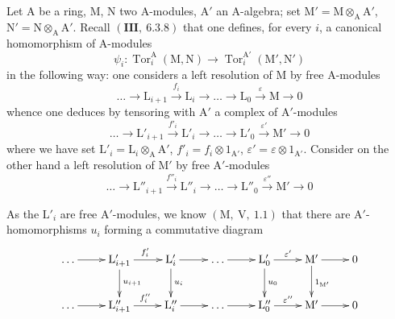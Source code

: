\begin{env}[11.2.1]
\label{IV.11.2.1}
Let $\mathrm{A}$ be a ring, $\mathrm{M}$, $\mathrm{N}$ two A-modules, $\mathrm{A}'$ an A-algebra; set $\mathrm{M}'=\mathrm{M}\otimes_\mathrm{A}\mathrm{A}'$, $\mathrm{N}'=\mathrm{N}\otimes_\mathrm{A}\mathrm{A}'$. Recall $(\textbf{III},~6.3.8)$ that one defines, for every $i$, a canonical homomorphism of A-modules
\begin{equation}
  \psi_i:\operatorname{Tor}_i^\mathrm{A}(\mathrm{M},\mathrm{N})\to\operatorname{Tor}_i^{\mathrm{A}'}(\mathrm{M}',\mathrm{N}')
  \tag{11.2.1.1}
\end{equation}
in the following way: one considers a left resolution of $\mathrm{M}$ by free A-modules
\begin{equation}
  \ldots\longrightarrow\mathrm{L}_{i+1}\xrightarrow{f_i}\mathrm{L}_i\longrightarrow\ldots\longrightarrow\mathrm{L}_0\xrightarrow{\varepsilon}\mathrm{M}\longrightarrow 0
  \tag{11.2.1.2}
\end{equation}
whence one deduces by tensoring with $\mathrm{A}'$ a complex of $\mathrm{A}'$-modules
\begin{equation}
  \ldots\longrightarrow\mathrm{L}'_{i+1}\xrightarrow{f'_i}\mathrm{L}'_i\longrightarrow\ldots\longrightarrow\mathrm{L}'_0\xrightarrow{\varepsilon'}\mathrm{M}'\longrightarrow 0
  \tag{11.2.1.3}
\end{equation}
where we have set $\mathrm{L}'_i=\mathrm{L}_i\otimes_\mathrm{A}\mathrm{A}'$, $f'_i=f_i\otimes 1_{\mathrm{A}'}$, $\varepsilon'=\varepsilon\otimes 1_{\mathrm{A}'}$. Consider on the other hand a left resolution of $\mathrm{M}'$ by free $\mathrm{A}'$-modules
\begin{equation}
  \ldots\longrightarrow\mathrm{L}''_{i+1}\xrightarrow{f''_i}\mathrm{L}''_i\longrightarrow\ldots\longrightarrow\mathrm{L}''_0\xrightarrow{\varepsilon''}\mathrm{M}'\longrightarrow 0
  \tag{11.2.1.4}
\end{equation}
\end{env}


As the $\mathrm{L}'_i$ are free $\mathrm{A}'$-modules, we know $(\mathrm{M},~\mathrm{V},~1.1)$ that there are $\mathrm{A}'$-homomorphisms $u_i$ forming a commutative diagram
\[
\xymatrix{
  \ldots \ar[r] & \mathrm{L}'_{i+1} \ar[r]^{f'_i} \ar[d]^{u_{i+1}} & \mathrm{L}'_i \ar[r] \ar[d]^{u_i} & \ldots \ar[r] & \mathrm{L}'_0 \ar[r]^{\varepsilon'} \ar[d]^{u_0} & \mathrm{M}' \ar[r] \ar[d]^{1_{\mathrm{M}'}} & 0 \\
  \ldots \ar[r] & \mathrm{L}''_{i+1} \ar[r]^{f''_i} & \mathrm{L}''_i \ar[r] & \ldots \ar[r] & \mathrm{L}''_0 \ar[r]^{\varepsilon''} & \mathrm{M}' \ar[r] & 0
}
\]

